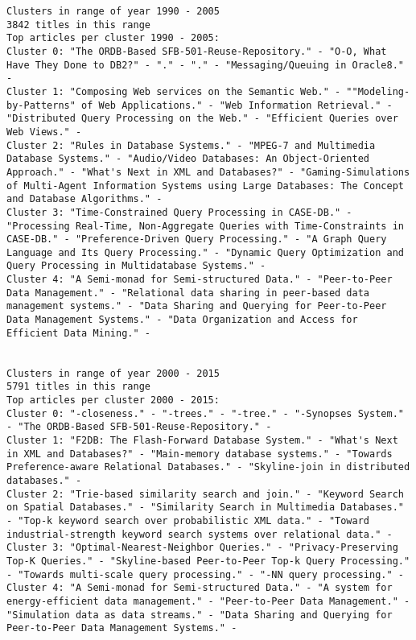 \documentclass[11pt]{article}
\begin{document}
\begin{verbatim}
Clusters in range of year 1990 - 2005
3842 titles in this range
Top articles per cluster 1990 - 2005:
Cluster 0: "The ORDB-Based SFB-501-Reuse-Repository." - "O-O, What Have They Done to DB2?" - "." - "." - "Messaging/Queuing in Oracle8." - 
Cluster 1: "Composing Web services on the Semantic Web." - ""Modeling-by-Patterns" of Web Applications." - "Web Information Retrieval." - "Distributed Query Processing on the Web." - "Efficient Queries over Web Views." - 
Cluster 2: "Rules in Database Systems." - "MPEG-7 and Multimedia Database Systems." - "Audio/Video Databases: An Object-Oriented Approach." - "What's Next in XML and Databases?" - "Gaming-Simulations of Multi-Agent Information Systems using Large Databases: The Concept and Database Algorithms." - 
Cluster 3: "Time-Constrained Query Processing in CASE-DB." - "Processing Real-Time, Non-Aggregate Queries with Time-Constraints in CASE-DB." - "Preference-Driven Query Processing." - "A Graph Query Language and Its Query Processing." - "Dynamic Query Optimization and Query Processing in Multidatabase Systems." - 
Cluster 4: "A Semi-monad for Semi-structured Data." - "Peer-to-Peer Data Management." - "Relational data sharing in peer-based data management systems." - "Data Sharing and Querying for Peer-to-Peer Data Management Systems." - "Data Organization and Access for Efficient Data Mining." - 


Clusters in range of year 2000 - 2015
5791 titles in this range
Top articles per cluster 2000 - 2015:
Cluster 0: "-closeness." - "-trees." - "-tree." - "-Synopses System." - "The ORDB-Based SFB-501-Reuse-Repository." - 
Cluster 1: "F2DB: The Flash-Forward Database System." - "What's Next in XML and Databases?" - "Main-memory database systems." - "Towards Preference-aware Relational Databases." - "Skyline-join in distributed databases." - 
Cluster 2: "Trie-based similarity search and join." - "Keyword Search on Spatial Databases." - "Similarity Search in Multimedia Databases." - "Top-k keyword search over probabilistic XML data." - "Toward industrial-strength keyword search systems over relational data." - 
Cluster 3: "Optimal-Nearest-Neighbor Queries." - "Privacy-Preserving Top-K Queries." - "Skyline-based Peer-to-Peer Top-k Query Processing." - "Towards multi-scale query processing." - "-NN query processing." - 
Cluster 4: "A Semi-monad for Semi-structured Data." - "A system for energy-efficient data management." - "Peer-to-Peer Data Management." - "Simulation data as data streams." - "Data Sharing and Querying for Peer-to-Peer Data Management Systems." - 



\end{verbatim}
\end{document}
